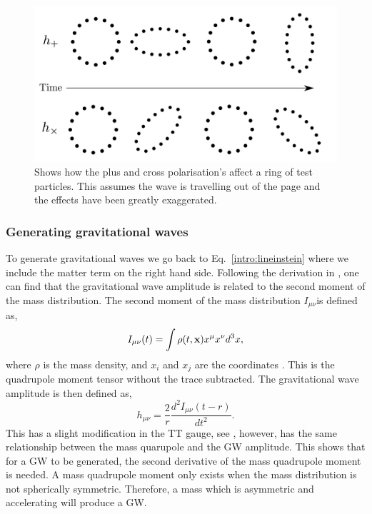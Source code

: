 \begin{figure}[h]
    \centering
    \includegraphics[width=\textwidth]{C1_Introduction/polarisation_ring.pdf}
    \caption{Shows how the plus and cross polarisation's affect a ring of test particles. This assumes the wave is travelling out of the page and the effects have been greatly exaggerated.}
    \label{gw:polarisations}
\end{figure}



\subsubsection{Generating gravitational waves}

To generate gravitational waves we go back to Eq.~\ref{intro:lineinstein} where we include the matter term on the right hand side.
Following the derivation in \citep{Flanagan2005TheTheory}, one can find that the gravitational wave amplitude is related to the second moment of the mass distribution.
The second moment of the mass distribution $I_{\mu\nu}$is defined as,
\begin{equation}
    I_{\mu \nu}(t) = \int \rho(t,{\bf x}) x^\mu x^\nu d^3x,
\end{equation}
where $\rho$ is the mass density, and $x_i$ and $x_j$ are the coordinates \citep{Flanagan2005TheTheory}. 
This is the quadrupole moment tensor without the trace subtracted.
The gravitational wave amplitude is then defined as,
\begin{equation}
\label{intro:gwamp}
    h_{\mu \nu} = \frac{2}{r}  \frac{d^2 I_{\mu \nu}(t-r)}{dt^2}.
\end{equation}
This has a slight modification in the TT gauge, see \citep{Flanagan2005TheTheory}, however, has the same relationship between the mass quarupole and the \ac{GW} amplitude.
This shows that for a \ac{GW} to be generated, the second derivative of the mass quadrupole moment is needed.
A mass quadrupole moment only exists when the mass distribution is not spherically symmetric.
Therefore, a mass which is asymmetric and accelerating will produce a \ac{GW}.

